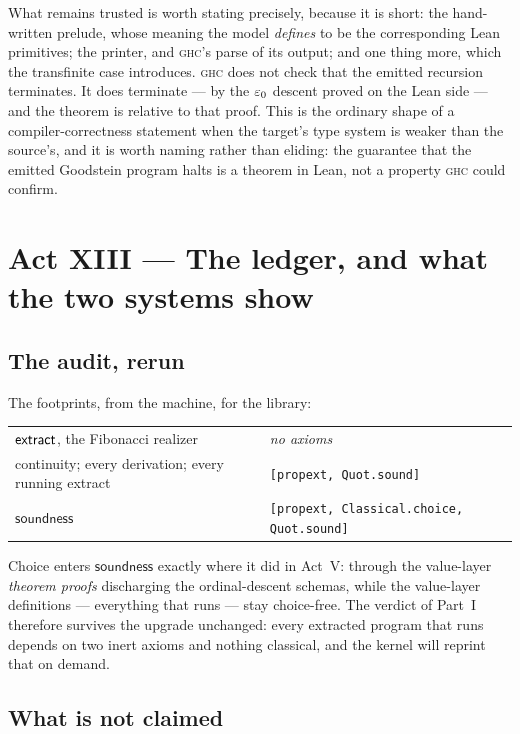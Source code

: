 What remains trusted is worth stating precisely, because it is short: the
hand-written prelude, whose meaning the model \emph{defines} to be the
corresponding Lean primitives; the printer, and \textsc{ghc}'s parse of its
output; and one thing more, which the transfinite case introduces.
\textsc{ghc} does not check that the emitted recursion terminates. It does
terminate --- by the $\varepsilon_0$ descent proved on the Lean side --- and the
theorem is relative to that proof. This is the ordinary shape of a
compiler-correctness statement when the target's type system is weaker than
the source's, and it is worth naming rather than eliding: the guarantee that
the emitted Goodstein program halts is a theorem in Lean, not a property
\textsc{ghc} could confirm.

\section{Act XIII --- The ledger, and what the two systems show}

\subsection*{The audit, rerun}

The footprints, from the machine, for the \haomega{} library:
\begin{center}\small
\begin{tabular}{ll}
\toprule
$\mathsf{extract}$, the Fibonacci realizer & \emph{no axioms}\\
continuity; every derivation; every running extract & \texttt{[propext, Quot.sound]}\\
$\mathsf{soundness}$ & \texttt{[propext, Classical.choice, Quot.sound]}\\
\bottomrule
\end{tabular}
\end{center}
Choice enters $\mathsf{soundness}$ exactly where it did in Act~V: through the
value-layer \emph{theorem proofs} discharging the ordinal-descent schemas,
while the value-layer definitions --- everything that runs --- stay
choice-free. The verdict of Part~I therefore survives the upgrade unchanged:
every extracted program that runs depends on two inert axioms and nothing
classical, and the kernel will reprint that on demand.

\subsection*{What is not claimed}


